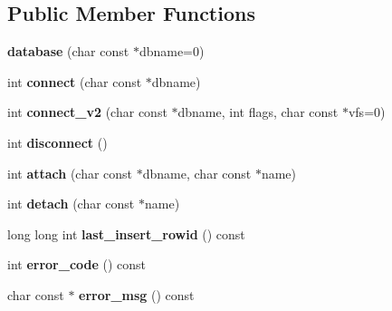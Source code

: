 \subsection*{Public Member Functions}
\begin{DoxyCompactItemize}
\item 
\hypertarget{classsqlite3pp_1_1database_ad82d2544bdc21484b1ad5ba1744224ee}{{\bfseries database} (char const $\ast$dbname=0)}\label{classsqlite3pp_1_1database_ad82d2544bdc21484b1ad5ba1744224ee}

\item 
\hypertarget{classsqlite3pp_1_1database_a84b8252faa02ddd1f49b41b065ae8bcb}{int {\bfseries connect} (char const $\ast$dbname)}\label{classsqlite3pp_1_1database_a84b8252faa02ddd1f49b41b065ae8bcb}

\item 
\hypertarget{classsqlite3pp_1_1database_ac52e19d2ca06314cb027dccbf78f2f70}{int {\bfseries connect\-\_\-v2} (char const $\ast$dbname, int flags, char const $\ast$vfs=0)}\label{classsqlite3pp_1_1database_ac52e19d2ca06314cb027dccbf78f2f70}

\item 
\hypertarget{classsqlite3pp_1_1database_a51227d51ba00357d093588ce7a9387c8}{int {\bfseries disconnect} ()}\label{classsqlite3pp_1_1database_a51227d51ba00357d093588ce7a9387c8}

\item 
\hypertarget{classsqlite3pp_1_1database_a1997005540b310306af57ce11da52964}{int {\bfseries attach} (char const $\ast$dbname, char const $\ast$name)}\label{classsqlite3pp_1_1database_a1997005540b310306af57ce11da52964}

\item 
\hypertarget{classsqlite3pp_1_1database_a54c017665849c1441595a9a3eb337011}{int {\bfseries detach} (char const $\ast$name)}\label{classsqlite3pp_1_1database_a54c017665849c1441595a9a3eb337011}

\item 
\hypertarget{classsqlite3pp_1_1database_af27c4fa34418d2af3735d195baa5b281}{long long int {\bfseries last\-\_\-insert\-\_\-rowid} () const }\label{classsqlite3pp_1_1database_af27c4fa34418d2af3735d195baa5b281}

\item 
\hypertarget{classsqlite3pp_1_1database_a8ba2facb29ad175924269b78a2970e6d}{int {\bfseries error\-\_\-code} () const }\label{classsqlite3pp_1_1database_a8ba2facb29ad175924269b78a2970e6d}

\item 
\hypertarget{classsqlite3pp_1_1database_a5b77f2e8faa87bd6512f1da3b1149b6a}{char const $\ast$ {\bfseries error\-\_\-msg} () const }\label{classsqlite3pp_1_1database_a5b77f2e8faa87bd6512f1da3b1149b6a}


\end{DoxyCompactItemize}
